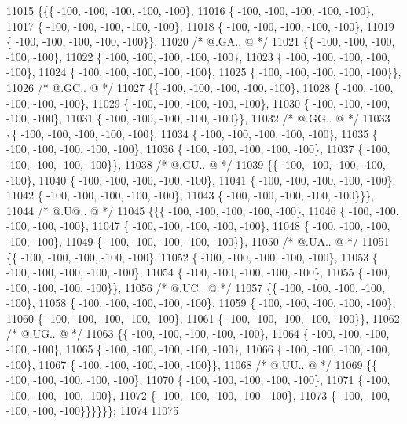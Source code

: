 \begin{DoxyCode}
11015 \{\{\{ -100, -100, -100, -100, -100\},
11016 \{ -100, -100, -100, -100, -100\},
11017 \{ -100, -100, -100, -100, -100\},
11018 \{ -100, -100, -100, -100, -100\},
11019 \{ -100, -100, -100, -100, -100\}\},
11020 \textcolor{comment}{/*  @.GA.. @ */}
11021 \{\{ -100, -100, -100, -100, -100\},
11022 \{ -100, -100, -100, -100, -100\},
11023 \{ -100, -100, -100, -100, -100\},
11024 \{ -100, -100, -100, -100, -100\},
11025 \{ -100, -100, -100, -100, -100\}\},
11026 \textcolor{comment}{/*  @.GC.. @ */}
11027 \{\{ -100, -100, -100, -100, -100\},
11028 \{ -100, -100, -100, -100, -100\},
11029 \{ -100, -100, -100, -100, -100\},
11030 \{ -100, -100, -100, -100, -100\},
11031 \{ -100, -100, -100, -100, -100\}\},
11032 \textcolor{comment}{/*  @.GG.. @ */}
11033 \{\{ -100, -100, -100, -100, -100\},
11034 \{ -100, -100, -100, -100, -100\},
11035 \{ -100, -100, -100, -100, -100\},
11036 \{ -100, -100, -100, -100, -100\},
11037 \{ -100, -100, -100, -100, -100\}\},
11038 \textcolor{comment}{/*  @.GU.. @ */}
11039 \{\{ -100, -100, -100, -100, -100\},
11040 \{ -100, -100, -100, -100, -100\},
11041 \{ -100, -100, -100, -100, -100\},
11042 \{ -100, -100, -100, -100, -100\},
11043 \{ -100, -100, -100, -100, -100\}\}\},
11044 \textcolor{comment}{/*  @.U@.. @ */}
11045 \{\{\{ -100, -100, -100, -100, -100\},
11046 \{ -100, -100, -100, -100, -100\},
11047 \{ -100, -100, -100, -100, -100\},
11048 \{ -100, -100, -100, -100, -100\},
11049 \{ -100, -100, -100, -100, -100\}\},
11050 \textcolor{comment}{/*  @.UA.. @ */}
11051 \{\{ -100, -100, -100, -100, -100\},
11052 \{ -100, -100, -100, -100, -100\},
11053 \{ -100, -100, -100, -100, -100\},
11054 \{ -100, -100, -100, -100, -100\},
11055 \{ -100, -100, -100, -100, -100\}\},
11056 \textcolor{comment}{/*  @.UC.. @ */}
11057 \{\{ -100, -100, -100, -100, -100\},
11058 \{ -100, -100, -100, -100, -100\},
11059 \{ -100, -100, -100, -100, -100\},
11060 \{ -100, -100, -100, -100, -100\},
11061 \{ -100, -100, -100, -100, -100\}\},
11062 \textcolor{comment}{/*  @.UG.. @ */}
11063 \{\{ -100, -100, -100, -100, -100\},
11064 \{ -100, -100, -100, -100, -100\},
11065 \{ -100, -100, -100, -100, -100\},
11066 \{ -100, -100, -100, -100, -100\},
11067 \{ -100, -100, -100, -100, -100\}\},
11068 \textcolor{comment}{/*  @.UU.. @ */}
11069 \{\{ -100, -100, -100, -100, -100\},
11070 \{ -100, -100, -100, -100, -100\},
11071 \{ -100, -100, -100, -100, -100\},
11072 \{ -100, -100, -100, -100, -100\},
11073 \{ -100, -100, -100, -100, -100\}\}\}\}\}\};
11074 
11075 
\end{DoxyCode}
